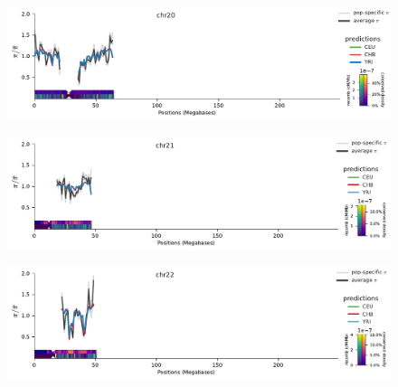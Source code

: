 \documentclass[11pt]{article}
\begin{document}
\begin{figure}[!htb]
  \centering
  \includegraphics[width=\textwidth]{figures/supplementary/pred_plot_chr20.pdf}
  \label{suppfig:fit-chr20}
\end{figure}


\begin{figure}[!htb]
  \centering
  \includegraphics[width=\textwidth]{figures/supplementary/pred_plot_chr21.pdf}
  \label{suppfig:fit-chr21}
\end{figure}


\begin{figure}[!htb]
  \centering
  \includegraphics[width=\textwidth]{figures/supplementary/pred_plot_chr22.pdf}
  \label{suppfig:fit-chr22}
\end{figure}

\clearpage
\end{document}
